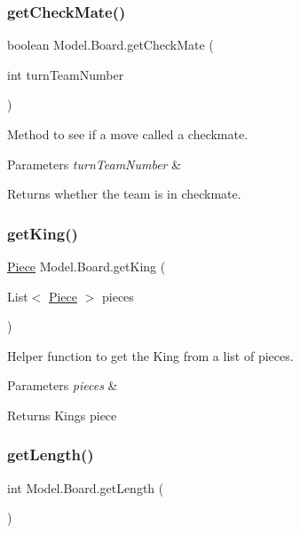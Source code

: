 \subsubsection{\texorpdfstring{get\+Check\+Mate()}{getCheckMate()}}
{\footnotesize\ttfamily boolean Model.\+Board.\+get\+Check\+Mate (\begin{DoxyParamCaption}\item[{int}]{turn\+Team\+Number }\end{DoxyParamCaption})}

Method to see if a move called a checkmate. 
\begin{DoxyParams}{Parameters}
{\em turn\+Team\+Number} & \\
\hline
\end{DoxyParams}
\begin{DoxyReturn}{Returns}
whether the team is in checkmate. 
\end{DoxyReturn}
\hypertarget{class_model_1_1_board_a0513468651fe1afccc197f700e2c760d}{}\label{class_model_1_1_board_a0513468651fe1afccc197f700e2c760d} 
\subsubsection{\texorpdfstring{get\+King()}{getKing()}}
{\footnotesize\ttfamily \hyperlink{class_model_1_1_pieces_1_1_piece}{Piece} Model.\+Board.\+get\+King (\begin{DoxyParamCaption}\item[{List$<$ \hyperlink{class_model_1_1_pieces_1_1_piece}{Piece} $>$}]{pieces }\end{DoxyParamCaption})}

Helper function to get the King from a list of pieces. 
\begin{DoxyParams}{Parameters}
{\em pieces} & \\
\hline
\end{DoxyParams}
\begin{DoxyReturn}{Returns}
King\textquotesingle{}s piece 
\end{DoxyReturn}
\hypertarget{class_model_1_1_board_a35e5cb89e9ade67a786764d0466adecf}{}\label{class_model_1_1_board_a35e5cb89e9ade67a786764d0466adecf} 
\subsubsection{\texorpdfstring{get\+Length()}{getLength()}}
{\footnotesize\ttfamily int Model.\+Board.\+get\+Length (\begin{DoxyParamCaption}{ }\end{DoxyParamCaption})}

